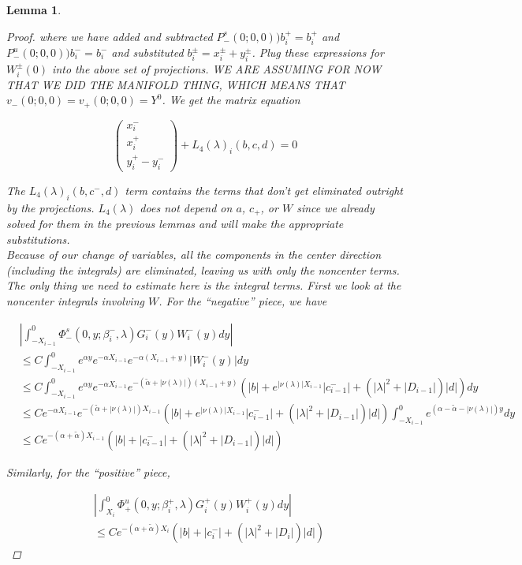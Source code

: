 \documentclass[12pt]{article}
\newtheorem{lemma}{Lemma}
\begin{document}
\begin{lemma}
\begin{proof}
where we have added and subtracted $P^s_-(0; 0, 0))b_i^+ = b_i^+$ and $P^u_-(0; 0, 0))b_i^- = b_i^-$ and substituted $b_i^\pm = x_i^\pm + y_i^\pm$. Plug these expressions for $W_i^\pm(0)$ into the above set of projections. WE ARE ASSUMING FOR NOW THAT WE DID THE MANIFOLD THING, WHICH MEANS THAT $v_-(0; 0, 0) = v_+(0; 0, 0) = Y^0$. We get the matrix equation

\[
\begin{pmatrix}x_i^- \\ x_i^+ \\ 
y_i^+ - y_i^- \end{pmatrix} + L_4(\lambda)_i(b, c, d) = 0
\]

The $L_4(\lambda)_i(b, c^-, d)$ term contains the terms that don't get eliminated outright by the projections. $L_4(\lambda)$ does not depend on $a$, $c_+$, or $W$ since we already solved for them in the previous lemmas and will make the appropriate substitutions.\\

Because of our change of variables, all the components in the center direction (including the integrals) are eliminated, leaving us with only the noncenter terms. The only thing we need to estimate here is the integral terms. First we look at the noncenter integrals involving $W$. For the ``negative'' piece, we have

\begin{align*}
&\left| \int_{-X_{i-1}}^0 \Phi^s_-(0, y; \beta_i^-, \lambda) G_i^-(y)W_i^-(y) dy \right| \\
&\leq C \int_{-X_{i-1}}^0 e^{\alpha y} e^{-\alpha X_{i-1}} e^{-\alpha(X_{i-1} + y)} |W_i^-(y)| dy \\
&\leq C \int_{-X_{i-1}}^0 e^{\alpha y} e^{-\alpha X_{i-1}} e^{-(\tilde{\alpha} + |\nu(\lambda)|)(X_{i-1} + y)} ( |b| + e^{|\nu(\lambda)|X_{i-1}}|c_{i-1}^-| + (|\lambda|^2 + |D_{i-1}|)|d| ) dy \\
&\leq C e^{-\alpha X_{i-1} } e^{-(\tilde{\alpha} + |\nu(\lambda)|) X_{i-1}}( |b| + e^{|\nu(\lambda)|X_{i-1}}|c_{i-1}^-| + (|\lambda|^2 + |D_{i-1}|)|d| ) \int_{-X_{i-1}}^0 e^{(\alpha - \tilde{\alpha} - |\nu(\lambda)|)y} dy \\
&\leq C e^{-(\alpha + \tilde{\alpha}) X_{i-1}}( |b| + |c_{i-1}^-| + (|\lambda|^2 + |D_{i-1}|)|d| )
\end{align*}

Similarly, for the ``positive'' piece,

\begin{align*}
&\left| \int_{X_i}^0 \Phi^u_+(0, y; \beta_i^+, \lambda) G_i^+(y)W_i^+(y) dy \right| \\
&\leq C e^{-(\alpha + \tilde{\alpha}) X_i}( |b| + |c_i^-| + (|\lambda|^2 + |D_i|)|d| )
\end{align*}


\end{proof}
\end{lemma}
\end{document}
